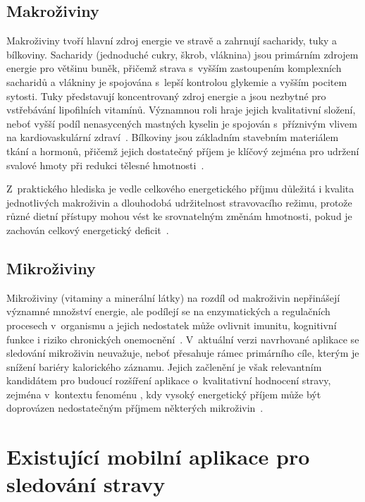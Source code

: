 \subsection{Makroživiny}
\label{subsec:makrozivny}

Makroživiny tvoří hlavní zdroj energie ve stravě a zahrnují sacharidy, tuky a bílkoviny.
Sacharidy (jednoduché cukry, škrob, vláknina) jsou primárním zdrojem energie pro většinu buněk, přičemž strava s~vyšším zastoupením komplexních sacharidů a vlákniny je spojována s~lepší kontrolou glykemie a vyšším pocitem sytosti.
Tuky představují koncentrovaný zdroj energie a jsou nezbytné pro vstřebávání lipofilních vitamínů.
Významnou roli hraje jejich kvalitativní složení, neboť vyšší podíl nenasycených mastných kyselin je spojován s~příznivým vlivem na kardiovaskulární zdraví~\cite{venn2020macronutrients}.
Bílkoviny jsou základním stavebním materiálem tkání a hormonů, přičemž jejich dostatečný příjem je klíčový zejména pro udržení svalové hmoty při redukci tělesné hmotnosti~\cite{venn2020macronutrients}.

Z~praktického hlediska je vedle celkového energetického příjmu důležitá i kvalita jednotlivých makroživin a dlouhodobá udržitelnost stravovacího režimu, protože různé dietní přístupy mohou vést ke srovnatelným změnám hmotnosti, pokud je zachován celkový energetický deficit~\cite{theodorakis2025humanEnergyBalance,drenowatz2025integrating}.

\subsection{Mikroživiny}
\label{subsec:mikrozivny}

Mikroživiny (vitaminy a minerální látky) na rozdíl od makroživin nepřinášejí významné množství energie, ale podílejí se na enzymatických a regulačních procesech v~organismu a jejich nedostatek může ovlivnit imunitu, kognitivní funkce i riziko chronických onemocnění~\cite{farag2021dietaryMicronutrients}.
V~aktuální verzi navrhované aplikace se sledování mikroživin neuvažuje, neboť přesahuje rámec primárního cíle, kterým je snížení bariéry kalorického záznamu.
Jejich začlenění je však relevantním kandidátem pro budoucí rozšíření aplikace o~kvalitativní hodnocení stravy, zejména v~kontextu fenoménu , kdy vysoký energetický příjem může být doprovázen nedostatečným příjmem některých mikroživin~\cite{farag2021dietaryMicronutrients}.

\section{Existující mobilní aplikace pro sledování stravy}
\label{sec:existujici}

